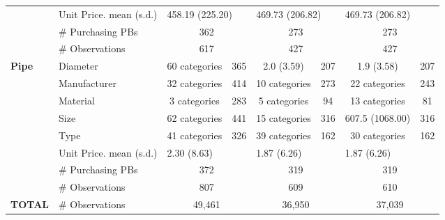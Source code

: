 \begin{longtable}{llccccccccc}
 \nopagebreak & Unit Price. mean (s.d.) & \multicolumn{3}{l}{458.19 (225.20)} & \multicolumn{3}{l}{469.73 (206.82)} & \multicolumn{3}{l}{469.73 (206.82)} \\* 
 \nopagebreak & \# Purchasing PBs & \multicolumn{3}{c}{362} & \multicolumn{3}{c}{273} & \multicolumn{3}{c}{273} \\* 
 \nopagebreak & \# Observations & \multicolumn{3}{c}{617} & \multicolumn{3}{c}{427} & \multicolumn{3}{c}{427} \\* 
 \midrule 
 \multirow{8}{*}{\textbf{Pipe}} & Diameter & \multicolumn{2}{c}{60 categories} & 365 & \multicolumn{2}{c}{2.0 (3.59)} & 207 & \multicolumn{2}{c}{1.9 (3.58)} & 207 \\* 
 & Manufacturer & \multicolumn{2}{c}{32 categories} & 414 & \multicolumn{2}{c}{10 categories} & 273 & \multicolumn{2}{c}{22 categories} & 243 \\* 
 & Material & \multicolumn{2}{c}{3 categories} & 283 & \multicolumn{2}{c}{5 categories} & 94 & \multicolumn{2}{c}{13 categories} & 81 \\* 
 & Size & \multicolumn{2}{c}{62 categories} & 441 & \multicolumn{2}{c}{15 categories} & 316 & \multicolumn{2}{c}{607.5 (1068.00)} & 316 \\* 
 & Type & \multicolumn{2}{c}{41 categories} & 326 & \multicolumn{2}{c}{39 categories} & 162 & \multicolumn{2}{c}{30 categories} & 162 \\* 
 \nopagebreak \cmidrule{2-11} 
 \nopagebreak & Unit Price. mean (s.d.) & \multicolumn{3}{l}{2.30 (8.63)} & \multicolumn{3}{l}{1.87 (6.26)} & \multicolumn{3}{l}{1.87 (6.26)} \\* 
 \nopagebreak & \# Purchasing PBs & \multicolumn{3}{c}{372} & \multicolumn{3}{c}{319} & \multicolumn{3}{c}{319} \\* 
 \nopagebreak & \# Observations & \multicolumn{3}{c}{807} & \multicolumn{3}{c}{609} & \multicolumn{3}{c}{610} \\* 
 \midrule 
\textbf{TOTAL} & \# Observations & \multicolumn{3}{c}{49,461} & \multicolumn{3}{c}{36,950} & \multicolumn{3}{c}{37,039} \\* 
 \end{longtable}
